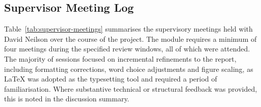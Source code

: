 \documentclass[12pt, a4paper, oneside]{report}
\begin{document}
\begin{appendices}

\chapter{Supervisor Meeting Log}
\label{appendix:meetings}

Table~\ref{tab:supervisor-meetings} summarises the supervisory meetings held with David Neilson over the course of the project. The module requires a minimum of four meetings during the specified review windows, all of which were attended. The majority of sessions focused on incremental refinements to the report, including formatting corrections, word choice adjustments and figure scaling, as LaTeX was adopted as the typesetting tool and required a period of familiarisation. Where substantive technical or structural feedback was provided, this is noted in the discussion summary.


\end{appendices}
\end{document}
